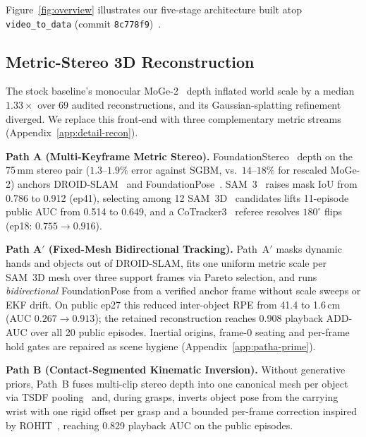\documentclass[10pt]{nvidiaextabstract}
\begin{document}
Figure~\ref{fig:overview} illustrates our five-stage architecture built atop \texttt{video\_to\_data} (commit \texttt{8c778f9})~\cite{v2d}.

\subsection{Metric-Stereo 3D Reconstruction}
\label{sec:recon}

The stock baseline's monocular MoGe-2~\cite{wang2025moge2} depth inflated world scale by a median $1.33\times$ over 69 audited reconstructions, and its Gaussian-splatting refinement~\cite{kerbl20233dgs} diverged. We replace this front-end with three complementary metric streams (Appendix~\ref{app:detail-recon}).

\textbf{Path A (Multi-Keyframe Metric Stereo).} FoundationStereo~\cite{wen2025foundationstereo} depth on the 75\,mm stereo pair ($1.3$--$1.9\%$ error against SGBM, vs.\ $14$--$18\%$ for rescaled MoGe-2) anchors DROID-SLAM~\cite{teed2021droid} and FoundationPose~\cite{wen2024foundationpose}. SAM~3~\cite{carion2025sam3} raises mask IoU from 0.786 to 0.912 (ep41), selecting among 12 SAM~3D~\cite{sam3dteam2025sam3d} candidates lifts 11-episode public AUC from 0.514 to 0.649, and a CoTracker3~\cite{karaev2025cotracker3} referee resolves $180^\circ$ flips (ep18: $0.755 \rightarrow 0.916$).

\textbf{Path A$'$ (Fixed-Mesh Bidirectional Tracking).} Path~A$'$ masks dynamic hands and objects out of DROID-SLAM, fits one uniform metric scale per SAM~3D mesh over three support frames via Pareto selection, and runs \emph{bidirectional} FoundationPose from a verified anchor frame without scale sweeps or EKF drift. On public ep27 this reduced inter-object RPE from 41.4 to 1.6\,cm (AUC $0.267 \rightarrow 0.913$); the retained reconstruction reaches 0.908 playback ADD-AUC over all 20 public episodes. Inertial origins, frame-0 seating and per-frame hold gates are repaired as scene hygiene (Appendix~\ref{app:patha-prime}).

\textbf{Path B (Contact-Segmented Kinematic Inversion).} Without generative priors, Path~B fuses multi-clip stereo depth into one canonical mesh per object via TSDF pooling~\cite{curless1996volumetric,zhou2018open3d} and, during grasps, inverts object pose from the carrying wrist with one rigid offset per grasp and a bounded per-frame correction inspired by ROHIT~\cite{rohit}, reaching 0.829 playback AUC on the public episodes.
\end{document}
